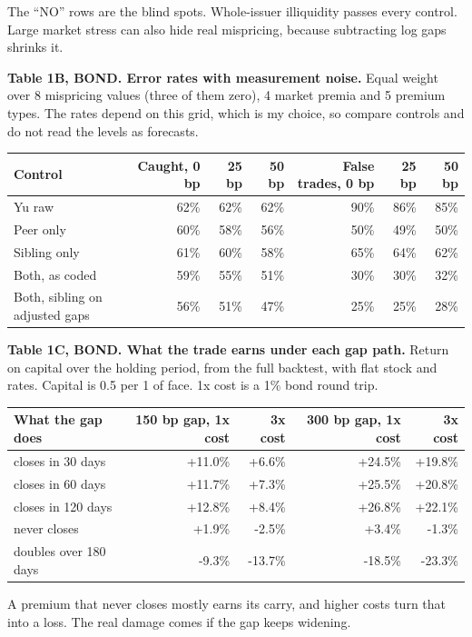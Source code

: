 \documentclass[10pt,a4paper]{article}
\begin{document}
The ``NO'' rows are the blind spots. Whole-issuer illiquidity passes every control. Large market stress can also hide real mispricing, because subtracting log gaps shrinks it.

\textbf{Table 1B, BOND. Error rates with measurement noise.} Equal weight over 8 mispricing values (three of them zero), 4 market premia and 5 premium types. The rates depend on this grid, which is my choice, so compare controls and do not read the levels as forecasts.
{\small
\begin{center}\begin{tabular}{lrrrrrr}\toprule
Control & Caught, 0 bp & 25 bp & 50 bp & False trades, 0 bp & 25 bp & 50 bp \\ \midrule
Yu raw & 62\% & 62\% & 62\% & 90\% & 86\% & 85\% \\
Peer only & 60\% & 58\% & 56\% & 50\% & 49\% & 50\% \\
Sibling only & 61\% & 60\% & 58\% & 65\% & 64\% & 62\% \\
Both, as coded & 59\% & 55\% & 51\% & 30\% & 30\% & 32\% \\
Both, sibling on adjusted gaps & 56\% & 51\% & 47\% & 25\% & 25\% & 28\% \\
\bottomrule\end{tabular}\end{center}}


\textbf{Table 1C, BOND. What the trade earns under each gap path.} Return on capital over the holding period, from the full backtest, with flat stock and rates. Capital is 0.5 per 1 of face. 1x cost is a 1\% bond round trip.
{\small
\begin{center}\begin{tabular}{lrrrr}\toprule
What the gap does & 150 bp gap, 1x cost & 3x cost & 300 bp gap, 1x cost & 3x cost \\ \midrule
closes in 30 days & +11.0\% & +6.6\% & +24.5\% & +19.8\% \\
closes in 60 days & +11.7\% & +7.3\% & +25.5\% & +20.8\% \\
closes in 120 days & +12.8\% & +8.4\% & +26.8\% & +22.1\% \\
never closes & +1.9\% & -2.5\% & +3.4\% & -1.3\% \\
doubles over 180 days & -9.3\% & -13.7\% & -18.5\% & -23.3\% \\
\bottomrule\end{tabular}\end{center}}

A premium that never closes mostly earns its carry, and higher costs turn that into a loss. The real damage comes if the gap keeps widening.
\end{document}
